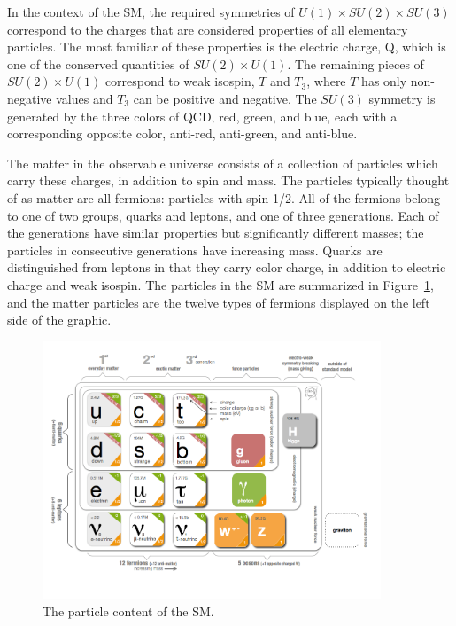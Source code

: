 In the context of the \ac{SM}, the required symmetries of $U(1)\times SU(2) \times SU(3)$ correspond to the charges that are considered properties of all elementary particles.
The most familiar of these properties is the electric charge, Q, which is one of the conserved quantities of $SU(2)\times U(1)$.
The remaining pieces of $SU(2)\times U(1)$ correspond to weak isospin, $T$ and $T_3$, where $T$ has only non-negative values and $T_3$ can be positive and negative.
The $SU(3)$ symmetry is generated by the three colors of \ac{QCD}, red, green, and blue, each with a corresponding opposite color, anti-red, anti-green, and anti-blue.

The matter in the observable universe consists of a collection of particles which carry these charges, in addition to spin and mass.
The particles typically thought of as matter are all fermions: particles with spin-1/2.
All of the fermions belong to one of two groups, quarks and leptons, and one of three generations.
Each of the generations have similar properties but significantly different masses; the particles in consecutive generations have increasing mass.
Quarks are distinguished from leptons in that they carry color charge, in addition to  electric charge and weak isospin.
The particles in the \ac{SM} are summarized in Figure~\ref{fig:particle_content}, and the matter particles are the twelve types of fermions displayed on the left side of the graphic.

\begin{figure}[h]
  \centering
  \includegraphics[width=0.9\textwidth]{figures/particle_content.png}
  \caption{The particle content of the \ac{SM}.}
  \label{fig:particle_content}
\end{figure}


